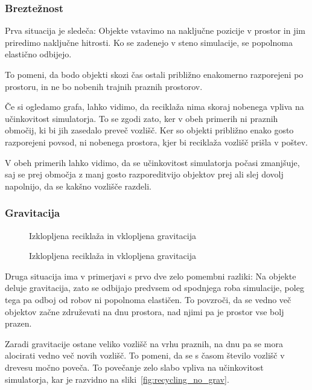 \documentclass[a4paper,12pt]{article}
\begin{document}
\subsubsection{Breztežnost}
Prva situacija je sledeča: Objekte vstavimo na naključne pozicije v prostor in jim priredimo naključne hitrosti. Ko 
se zadenejo v steno simulacije, se popolnoma elastično odbijejo.

To pomeni, da bodo objekti skozi čas ostali približno enakomerno razporejeni po prostoru,
in ne bo nobenih trajnih praznih prostorov.


Če si ogledamo grafa, lahko vidimo, da reciklaža nima skoraj nobenega vpliva na učinkovitost simulatorja. To se zgodi zato, ker
v obeh primerih ni praznih območij, ki bi jih zasedalo preveč vozlišč. Ker so objekti približno enako gosto razporejeni povsod,
ni nobenega prostora, kjer bi reciklaža vozlišč prišla v poštev.


V obeh primerih lahko vidimo, da se učinkovitost simulatorja
počasi zmanjšuje, saj se prej območja z manj gosto razporeditvijo objektov prej ali slej dovolj napolnijo, da se kakšno vozlišče
razdeli.

\clearpage

\subsubsection{Gravitacija}

\begin{wrapfigure}{r}{0.45\textwidth}
    \caption{Izklopljena reciklaža in vklopljena gravitacija}%
    \label{fig:recycling_no_grav}
    \vspace{0.5cm}
    \caption{Izklopljena reciklaža in vklopljena gravitacija}%
    \label{fig:recycling_yes_grav}
\end{wrapfigure}

Druga situacija ima v primerjavi s prvo dve zelo pomembni razliki: Na objekte deluje gravitacija, zato se odbijajo predvsem od spodnjega
roba simulacije, poleg tega pa odboj od robov ni popolnoma elastičen. To povzroči, da se vedno več objektov začne združevati na dnu prostora, nad
njimi pa je prostor vse bolj prazen.

Zaradi gravitacije ostane veliko vozlišč na vrhu praznih, na dnu pa se mora alocirati vedno več novih vozlišč. To pomeni, da se s časom
število vozlišč v drevesu močno poveča. To povečanje zelo slabo vpliva na učinkovitost simulatorja, 
kar je razvidno na sliki~\ref{fig:recycling_no_grav}.
\end{document}
